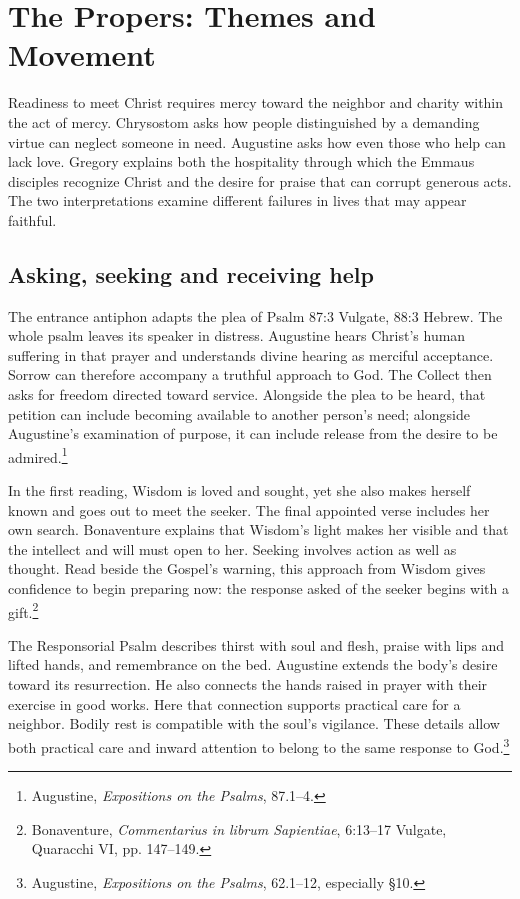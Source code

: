 \section{The Propers: Themes and Movement}
Readiness to meet Christ requires mercy toward the neighbor and charity within the act of mercy. Chrysostom asks how people distinguished by a demanding virtue can neglect someone in need. Augustine asks how even those who help can lack love. Gregory explains both the hospitality through which the Emmaus disciples recognize Christ and the desire for praise that can corrupt generous acts. The two interpretations examine different failures in lives that may appear faithful.

\subsection{Asking, seeking and receiving help}
The entrance antiphon adapts the plea of Psalm 87:3 Vulgate, 88:3 Hebrew. The whole psalm leaves its speaker in distress. Augustine hears Christ's human suffering in that prayer and understands divine hearing as merciful acceptance. Sorrow can therefore accompany a truthful approach to God. The Collect then asks for freedom directed toward service. Alongside the plea to be heard, that petition can include becoming available to another person's need; alongside Augustine's examination of purpose, it can include release from the desire to be admired.\footnote{Augustine, \textit{Expositions on the Psalms}, 87.1--4.}

In the first reading, Wisdom is loved and sought, yet she also makes herself known and goes out to meet the seeker. The final appointed verse includes her own search. Bonaventure explains that Wisdom's light makes her visible and that the intellect and will must open to her. Seeking involves action as well as thought. Read beside the Gospel's warning, this approach from Wisdom gives confidence to begin preparing now: the response asked of the seeker begins with a gift.\footnote{Bonaventure, \textit{Commentarius in librum Sapientiae}, 6:13--17 Vulgate, Quaracchi VI, pp. 147--149.}

The Responsorial Psalm describes thirst with soul and flesh, praise with lips and lifted hands, and remembrance on the bed. Augustine extends the body's desire toward its resurrection. He also connects the hands raised in prayer with their exercise in good works. Here that connection supports practical care for a neighbor. Bodily rest is compatible with the soul's vigilance. These details allow both practical care and inward attention to belong to the same response to God.\footnote{Augustine, \textit{Expositions on the Psalms}, 62.1--12, especially §10.}

